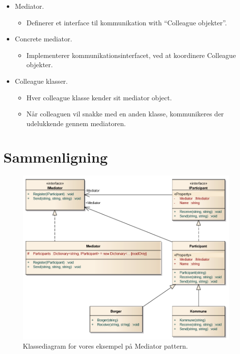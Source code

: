 \begin{itemize}
	\item Mediator.
	\begin{itemize}
		\item 	Definerer et interface til kommunikation with “Colleague objekter”.
	\end{itemize}
	\item Concrete mediator.
	\begin{itemize}
		\item 	Implementerer kommunikationsinterfacet, ved at koordinere Colleague objekter.
	\end{itemize}
	\item Colleague klasser.
	\begin{itemize}
		\item Hver colleague klasse kender sit mediator object.
		\item Når colleaguen vil snakke med en anden klasse, kommunikeres der udelukkende gennem mediatoren.
	\end{itemize}
\end{itemize}

\section{Sammenligning}

\begin{figure}[h]
	\centering
	\includegraphics[width=\linewidth]{figs/classdiagram}
	\caption{Klassediagram for vores eksempel på Mediator pattern.}
	\label{fig:mediclass}
\end{figure}

